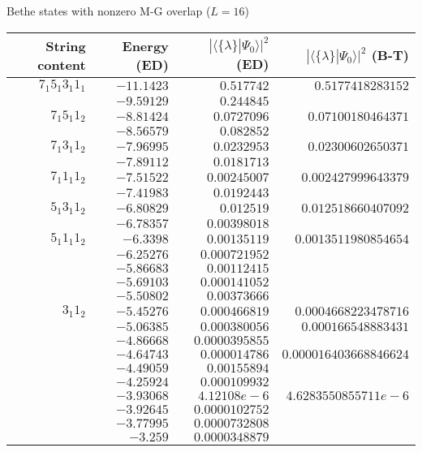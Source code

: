 \documentclass[12pt,a4paper,final]{iopart}
\begin{document}
\begin{table}[h]
\scriptsize
\centering
Bethe states with nonzero M-G overlap ($L=16$)\\[1ex]
\begin{tabular}{rrrr}
String content & Energy (ED) & $|\langle \{\lambda\}| \Psi_0 \rangle|^2$ (ED) & $|\langle \{\lambda\}| \Psi_0 \rangle|^2$ (B-T) \\[0.3em]
\toprule
$7_1 5_1 3_1 1_1$ & $-11.1423$ & $0.517742$         & $0.5177418283152$\\
& $-9.59129$ & $0.244845$         &\\
$7_1 5_1 1_2$ & $-8.81424$ & $0.0727096$        & $0.07100180464371$\\
& $-8.56579$ & $0.082852$         &\\
$7_1 3_1 1_2$ & $-7.96995$ & $0.0232953$        & $0.02300602650371$\\
& $-7.89112$  & $0.0181713$        &\\
$7_1 1_1 1_2$ & $-7.51522$ & $0.00245007$       & $0.002427999643379$\\
& $-7.41983$ & $0.0192443$        &\\
$5_1 3_1 1_2$ & $-6.80829$ & $0.012519$         & $0.012518660407092$\\
& $-6.78357$ & $0.00398018$       &\\
$5_1 1_1 1_2$ & $-6.3398$  &  $0.00135119$      & $0.0013511980854654$\\
& $-6.25276$ & $0.000721952$      &\\
& $-5.86683$ & $0.00112415$       &\\
& $-5.69103$ & $0.000141052$      &\\
& $-5.50802$ & $0.00373666$       &\\
$3_1 1_2$ & $-5.45276$ & $0.000466819$      & $0.0004668223478716$\\
& $-5.06385$ & $0.000380056$      & $0.000166548883431$\\
& $-4.86668$ & $0.0000395855$     &\\
& $-4.64743$ & $0.000014786$      & $0.000016403668846624$\\
& $-4.49059$ & $0.00155894$       &\\
& $-4.25924$ & $0.000109932$      &\\
& $-3.93068$ & $4.12108e-6$       & $4.6283550855711e-6$\\
& $-3.92645$ & $0.0000102752$     &\\
& $-3.77995$ & $0.0000732808$     &\\
& $-3.259$   & $0.0000348879$     &\\

\end{tabular}
\end{table}
\end{document}
